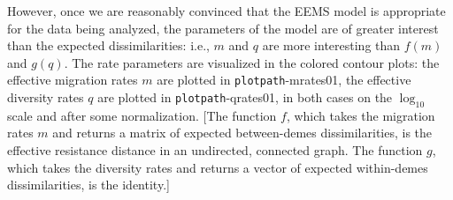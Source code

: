 \documentclass[a4paper,10pt,DIV=15,titlepage,mpinclude=true]{scrartcl}
\newcommand{\keystring}[1]{{\tt #1}}
\begin{document}
However, once we are reasonably convinced that the EEMS model is appropriate for the data being analyzed, the parameters of the model are of greater interest than the expected dissimilarities: i.e., $m$ and $q$ are more interesting than $f(m)$ and $g(q)$. The rate parameters are visualized in the colored contour plots: the effective migration rates $m$ are plotted in \keystring{plotpath}-mrates01, the effective diversity rates $q$ are plotted in \keystring{plotpath}-qrates01, in both cases on the $\log_{10}$ scale and after some normalization. [The function $f$, which takes the migration rates $m$ and returns a matrix of expected between-demes dissimilarities, is the effective resistance distance in an undirected, connected graph. The function $g$, which takes the diversity rates and returns a vector of expected within-demes dissimilarities, is the identity.]
\end{document}
